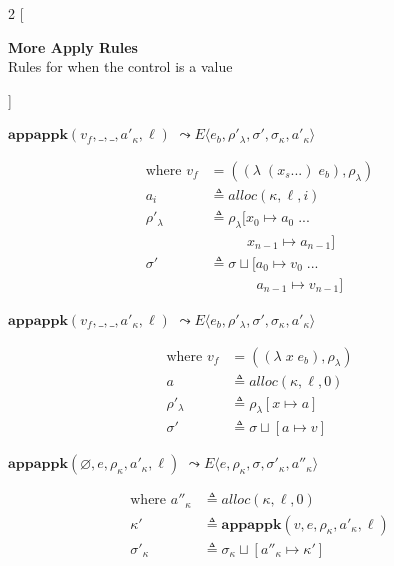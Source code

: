 \documentclass[12pt,draft]{article}
\newcommand{\lamsyn}[2]{(\lambda\;(#1 ...)\;#2)}
\newcommand{\vararglamsyn}[2]{(\lambda\;#1\;#2)}
\begin{document}
\begin{multicols*}{2}
[
\begin{center}
\textbf{More Apply Rules} \\
Rules for when the control is a value
\end{center}
]
\begin{center}
  $\textbf{appappk}(v_f, \_, \_, a'_\kappa, \ell)$
  $\leadsto E\langle e_b , \rho'_\lambda , \sigma',\sigma_\kappa,a'_\kappa \rangle$
\end{center}
\vspace{-7mm}
\begin{align*}
  \text{where }
  v_f &= (\lamsyn{x_s}{e_b}, \rho_{\lambda}) \\
  a_i &\triangleq alloc(\kappa, \ell, i) \\
  \rho'_{\lambda} &\triangleq \rho_{\lambda}[x_0 \mapsto a_0\; ... \\
      &\;\;\;\;\;\;\;\;\;\,x_{n-1} \mapsto a_{n-1}] \\
  \sigma' &\triangleq \sigma \sqcup [a_0 \mapsto v_0\;...\\
      &\;\;\;\;\;\;\;\;\;\;\;\;a_{n-1} \mapsto v_{n-1}]
\end{align*}
\begin{center}
  $\textbf{appappk}(v_f, \_, \_, a'_\kappa, \ell)$
  $\leadsto E\langle e_b , \rho'_\lambda,\sigma',\sigma_\kappa,a'_\kappa \rangle$
\end{center}
\vspace{-7mm}
\begin{align*}
  \text{where }
  v_f &= (\vararglamsyn{x}{e_b}, \rho_{\lambda}) \\
  a &\triangleq alloc(\kappa, \ell, 0) \\
  \rho'_{\lambda} &\triangleq \rho_{\lambda}[x \mapsto a] \\
  \sigma' &\triangleq \sigma \sqcup [a \mapsto v]
\end{align*}
\begin{center}
  $\textbf{appappk}(\varnothing, e, \rho_\kappa, a'_\kappa, \ell)$
  $\leadsto E\langle e,\rho_\kappa,\sigma , \sigma'_\kappa , a''_\kappa \rangle$
\end{center}
\vspace{-7mm}
\begin{align*}
  \text{where }
  a''_\kappa &\triangleq alloc(\kappa, \ell, 0) \\
  \kappa' &\triangleq \textbf{appappk}(v, e, \rho_\kappa, a'_\kappa, \ell) \\
  \sigma'_\kappa &\triangleq \sigma_\kappa \sqcup [a''_\kappa \mapsto \kappa']
\end{align*}


\end{multicols*}
\end{document}

